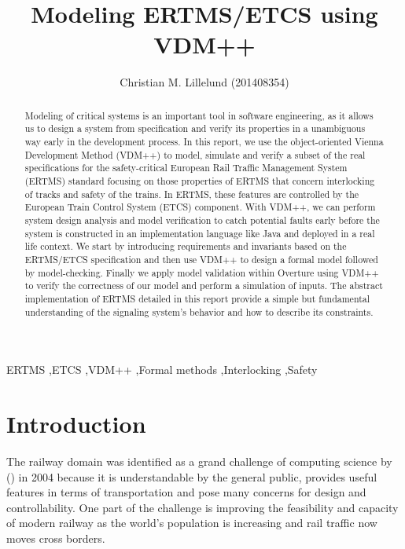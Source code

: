 \documentclass[preprint,12pt]{elsarticle}
\begin{document}
\begin{frontmatter}

\title{Modeling ERTMS/ETCS using VDM++}


\author{Christian M. Lillelund (201408354)}

\address{School of Engineering, Aarhus University}

\address{Course: E18 - Modeling of Critical Systems}

\begin{abstract}
Modeling of critical systems is an important tool in software engineering, as it allows us to design a system from specification and verify its properties in a unambiguous way early in the development process. In this report, we use the object-oriented Vienna Development Method (VDM++) to model, simulate and verify a subset of the real specifications for the safety-critical European Rail Traffic Management System (ERTMS) standard focusing on those properties of ERTMS that concern interlocking of tracks and safety of the trains. In ERTMS, these features are controlled by the European Train Control System (ETCS) component. With VDM++, we can perform system design analysis and model verification to catch potential faults early before the system is constructed in an implementation language like Java and deployed in a real life context. We start by introducing requirements and invariants based on the ERTMS/ETCS specification and then use VDM++ to design a formal model followed by model-checking. Finally we apply model validation within Overture using VDM++ to verify the correctness of our model and perform a simulation of inputs. The abstract implementation of ERTMS detailed in this report provide a simple but fundamental understanding of the signaling system's behavior and how to describe its constraints.
\end{abstract}

\begin{keyword}
ERTMS \sep ETCS \sep VDM++ \sep Formal methods \sep Interlocking \sep Safety
\end{keyword}

\end{frontmatter}

\section{Introduction}
\label{S:introduction}
The railway domain was identified as a grand challenge of computing science by (\citet{Challenge}) in 2004 because it is understandable by the general public, provides useful features in terms of transportation and pose many concerns for design and controllability. One part of the challenge is improving the feasibility and capacity of modern railway as the world's population is increasing and rail traffic now moves cross borders.
\end{document}
